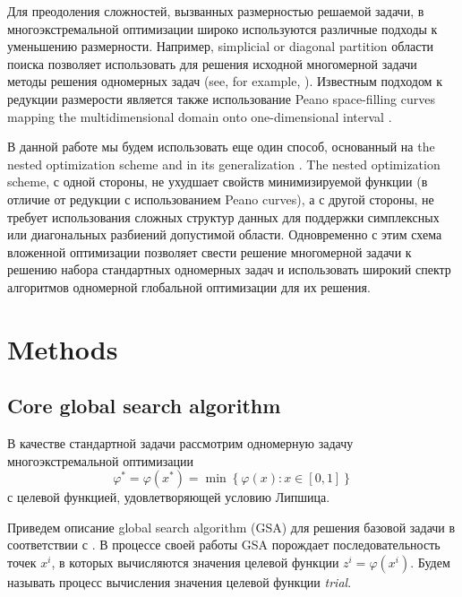 \documentclass[entropy,article,submit,moreauthors,pdftex]{Definitions/mdpi}
\begin{document}
Для преодоления сложностей, вызванных размерностью решаемой задачи, в многоэкстремальной оптимизации широко используются различные подходы к уменьшению размерности.  
Например, simplicial or diagonal partition области поиска позволяет использовать для решения исходной многомерной задачи методы решения одномерных задач (see, for example, \cite{PaulaviciusZilinskas2014,Sergeyev2017,Sergeyev2013}). 
Известным подходом к редукции размерости является также использование Peano space-filling curves mapping the multidimensional domain onto one-dimensional interval \cite{Strongin2000}.

В данной работе мы будем использовать еще один способ, основанный на the nested optimization scheme \cite{Shi2000,Grishagin2001,VanDam2010,Grishagin2015} and in its generalization \cite{Grishagin2016,Grishagin2016_1}.
The nested optimization scheme, с одной стороны, не ухудшает свойств минимизируемой функции (в отличие от редукции с использованием Peano curves), а с другой стороны, не требует использования сложных структур данных для поддержки симплексных или диагональных разбиений допустимой области. 
Одновременно с этим схема вложенной оптимизации позволяет свести решение многомерной задачи к решению набора стандартных одномерных задач и использовать широкий спектр алгоритмов одномерной глобальной оптимизации для их решения.

\section{Methods}

\subsection{Core global search algorithm}\label{CoreGSA}

В качестве стандартной задачи рассмотрим одномерную задачу многоэкстремальной оптимизации 
\begin{equation}\label{uni_problem}
\varphi^\ast = \varphi(x^\ast)=\min{\left\{\varphi(x):x\in \left[0,1\right] 
\right\}}
\end{equation}
с целевой функцией, удовлетворяющей условию Липшица.

Приведем описание global search algorithm (GSA) для решения базовой задачи в соответствии с \cite{Strongin2000}.
В процессе своей работы GSA порождает последовательность точек $x^i$, в которых вычисляются значения целевой функции $z^i=\varphi(x^i)$. 
Будем называть процесс вычисления значения целевой функции \textit{trial}.
\end{document}
